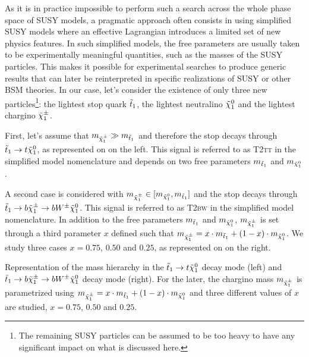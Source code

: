     As it is in practice impossible to perform such a search across the whole phase
    space of SUSY models, a pragmatic approach often consists in using simplified SUSY
    models where an
    effective Lagrangian introduces a limited set of new physics features. In such
    simplified models, the free parameters are usually taken to be experimentally
    meaningful quantities, such as the masses of the SUSY particles. This makes
    it possible for experimental searches to produce generic results that can later
    be reinterpreted in specific realizations of SUSY \cite{LiemSMS, SmodelS}
    or other BSM theories. In our case, let's consider the existence of only three new
    particles\footnote{The remaining SUSY particles can be assumed to be too heavy to
    have any significant impact on what is discussed here.}: the lightest stop quark
    $\tilde{t}_1$, the lightest neutralino $\tilde{\chi}_1^0$ and the lightest chargino $
    \tilde{\chi}_1^\pm$.

    First, let's assume that $m_{\tilde{\chi}_1^\pm} \gg m_{\tilde{t}_1}$ and therefore the
    stop decays through $\tilde{t}_1 \rightarrow t \tilde{\chi}_1^0$, as represented on
     on the left. This signal is referred to as \textsc{T2tt}
    in the simplified model nomenclature and depends on two free parameters
    $m_{\tilde{t}_1}$ and $m_{\tilde{\chi}_1^0}$.

    A second case is considered with $m_{\tilde{\chi}_1^\pm} \in [m_{\tilde{\chi}_1^0},
    m_{\tilde{t}_1}]$ and the stop decays through $\tilde{t}_1 \rightarrow b \tilde{\chi}_1^\pm
    \rightarrow b W^{\pm} \tilde{\chi}_1^0$. This signal is referred to as \textsc{T2bw}
    in the simplified model nomenclature. In addition to the free  parameters
    $m_{\tilde{t}_1}$ and $m_{\tilde{\chi}_1^0}$, $m_{\tilde{\chi}_1^\pm}$ is set through a
    third parameter $x$ defined such that $m_{\tilde{\chi}_1^\pm} = x \cdot m_{\tilde{t}_1}
    + (1 - x) \cdot m_{\tilde{\chi}_1^0}$. We study three cases $x = 0.75$, $0.50$
    and $0.25$, as represented on  on the right.

                 {Representation of the mass hierarchy in the $\tilde{t}_1 \rightarrow t
                 \tilde{\chi}_1^0$ decay mode (left) and $\tilde{t}_1 \rightarrow b
                 \tilde{\chi}_1^\pm \rightarrow b W^{\pm} \tilde{\chi}_1^0 $ decay mode (right).
                 For the later, the chargino mass $m_{\tilde{\chi}_1^\pm}$ is
                 parametrized using $m_{\tilde{\chi}_1^\pm} = x \cdot m_{\tilde{t}_1}
                 + (1 - x) \cdot m_{\tilde{\chi}_1^0}$ and three different values of $x$
                 are studied, $x = 0.75$, $0.50$ and $0.25$. }

